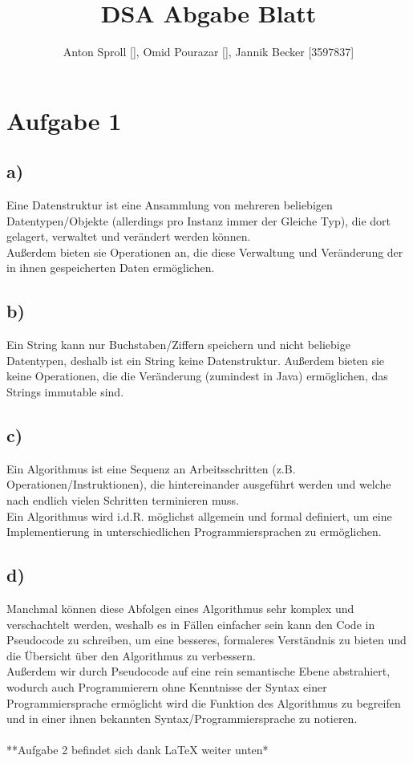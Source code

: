 \documentclass{scrartcl}
\title{DSA Abgabe Blatt \workSheet}
\author{Anton Sproll [], Omid Pourazar [], Jannik Becker [3597837]}
\date{\dateOfFinishing }
\begin{document}
	\maketitle
	\newpage

	\section*{Aufgabe 1}
	\subsection*{a)}
	Eine Datenstruktur ist eine  Ansammlung von mehreren beliebigen Datentypen/Objekte (allerdings pro Instanz immer der Gleiche Typ), die dort gelagert, verwaltet und verändert werden können. \\
	Außerdem bieten sie Operationen an, die diese Verwaltung und Veränderung der in ihnen gespeicherten Daten ermöglichen.

	\subsection*{b)}
	Ein String kann nur Buchstaben/Ziffern speichern und nicht beliebige Datentypen, deshalb ist ein String keine Datenstruktur.
	Außerdem bieten sie keine Operationen, die die Veränderung (zumindest in Java) ermöglichen, das Strings immutable sind.

	\subsection*{c)}
	Ein Algorithmus ist eine Sequenz an Arbeitsschritten (z.B. Operationen/Instruktionen), die hintereinander ausgeführt werden und welche nach endlich vielen Schritten terminieren muss.  \\
	Ein Algorithmus wird i.d.R. möglichst allgemein und formal definiert, um eine Implementierung in unterschiedlichen Programmiersprachen zu ermöglichen.

	\subsection*{d)}
	Manchmal können diese Abfolgen eines Algorithmus sehr komplex und verschachtelt werden, weshalb es in Fällen einfacher sein kann den Code in Pseudocode zu schreiben, um eine besseres, formaleres Verständnis zu bieten und die Übersicht über den Algorithmus zu verbessern. \\
	Außerdem wir durch Pseudocode auf eine rein semantische Ebene abstrahiert, wodurch auch Programmierern ohne Kenntnisse der Syntax einer Programmiersprache ermöglicht wird die Funktion des Algorithmus zu begreifen und in einer ihnen bekannten Syntax/Programmiersprache zu notieren. \\
	\\
	**Aufgabe 2 befindet sich dank LaTeX weiter unten*
\end{document}

